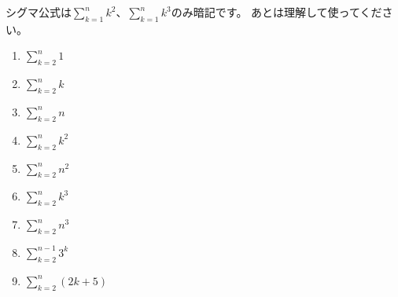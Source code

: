 \documentclass[12pt,a4paper]{jsarticle}
\begin{document}
シグマ公式は$\sum\limits_{k=1}^{n}k^2$、$\sum\limits_{k=1}^{n}k^3$のみ暗記です。
あとは理解して使ってください。
\begin{enumerate}
    \item $\sum\limits_{k=2}^{n}1$
    \item $\sum\limits_{k=2}^{n}k$
    \item $\sum\limits_{k=2}^{n}n$
    \item $\sum\limits_{k=2}^{n}k^2$
    \item $\sum\limits_{k=2}^{n}n^2$
    \item $\sum\limits_{k=2}^{n}k^3$
    \item $\sum\limits_{k=2}^{n}n^3$
    \item $\sum\limits_{k=2}^{n-1}3^k$
    \item $\sum\limits_{k=2}^{n}(2k+5)$
\end{enumerate}
\end{document}
